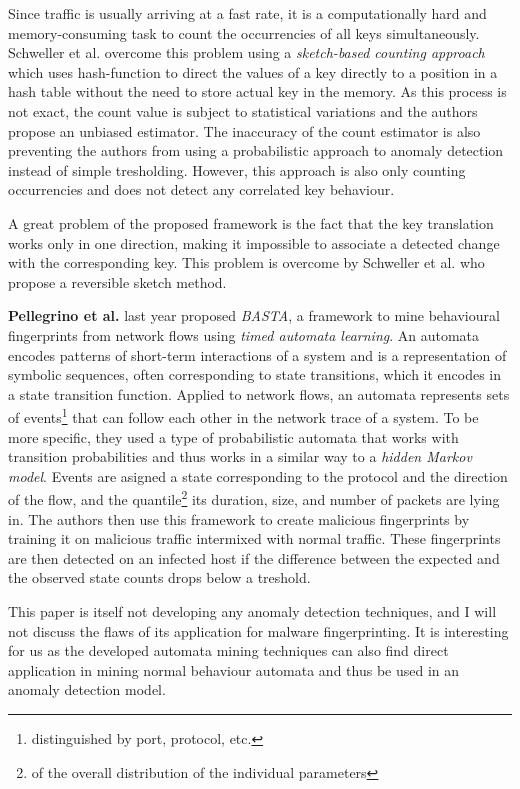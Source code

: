 \documentclass[a4paper,12pt,twoside]{report}
\begin{document}
Since traffic is usually arriving at a fast rate, it is a computationally hard and memory-consuming task to count the occurrencies of all keys simultaneously. Schweller et al.  overcome this problem using a \textit{sketch-based counting approach} which uses hash-function to direct the values of a key directly to a position in a hash table without the need to store actual key in the memory. As this process is not exact, the count value is subject to statistical variations and the authors propose an unbiased estimator. The inaccuracy of the count estimator is also preventing the authors from using a probabilistic approach to anomaly detection instead of simple tresholding. However, this approach is also only counting occurrencies and does not detect any correlated key behaviour.

A great problem of the proposed framework is the fact that the key translation works only in one direction, making it impossible to associate a detected change with the corresponding key. This problem is overcome by Schweller et al.\cite{schweller2004reversible} who propose a reversible sketch method.

\textbf{Pellegrino et al.} \cite{pellegrino2017learning} last year proposed \textit{BASTA}, a framework to mine behavioural fingerprints from network flows using \textit{timed automata learning}. An automata encodes patterns of short-term interactions of a system and is a representation of symbolic sequences, often corresponding to state transitions, which it encodes in a state transition function. Applied to network flows, an automata represents sets of events\footnote{distinguished by port,  protocol, etc.} that can follow each other in the network trace of a system. To be more specific, they used a type of probabilistic automata that works with transition probabilities and thus works in a similar way to a \textit{hidden Markov model}. Events are asigned a state corresponding to the protocol and the direction of the flow, and the quantile\footnote{of the overall distribution of the individual parameters} its duration, size, and number of packets are lying in. The authors then use this framework to create malicious fingerprints by training it on malicious traffic intermixed with normal traffic. These fingerprints are then detected on an infected host if the difference between the expected and the observed state counts drops below a treshold. 

This paper is itself not developing any anomaly detection techniques, and I will not discuss the flaws of its application for malware fingerprinting. It is interesting for us as the developed automata mining techniques can also find direct application in mining normal behaviour automata and thus be used in an anomaly detection model. 
\end{document}
